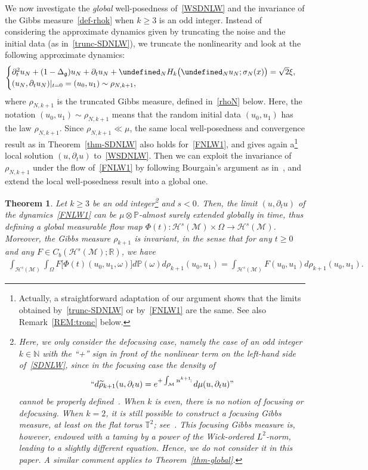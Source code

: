 \documentclass[10pt]{amsart}
\newtheorem{theo}{Theorem}[section]
\theoremstyle{definition}\newtheorem{defi}[theo]{Definition}\newtheorem{rema}[theo]{Remark}\newtheorem{exam}[theo]{Example}\newtheorem{exem}[theo]{Example}\newtheorem{nota}[theo]{Notation}
\newcommand{\R}{\mathbb{R}}
\newcommand{\T}{\mathbb{T}}
\newcommand{\Prob}{\mathbb{P}}
\newcommand{\N}{\mathbb{N}}
\let\P= \undefined
\newcommand{\P}{\mathbf{P}}
\newcommand{\M}{\mathcal{M}}
\renewcommand{\H}{\mathcal{H}}
\newcommand{\g}{\mathfrak{g}}
\newcommand{\Dlg}{\Delta_{\g}}
\newcommand{\s}{\sigma}
\newcommand{\dt}{\partial_t}
\renewcommand{\o}{\omega}
\renewcommand{\O}{\Omega}
\begin{document}
We now investigate the \emph{global} well-posedness of~\eqref{WSDNLW} and the invariance of the Gibbs measure~\eqref{def-rhok} when $k\ge 3$ is an odd integer. Instead of considering the approximate dynamics given by truncating the noise and the initial data (as in~\eqref{trunc-SDNLW}), we truncate the nonlinearity and look at the following approximate dynamics:
\begin{equation}\label{FNLW1}
\begin{cases}
\dt^2 u_N +(1-\Dlg)u_N + \dt u_N + \P_NH_k\big(\P_N u_N;\s_N(x)\big) = \sqrt{2}\xi,\\
(u_N,\dt u_N)|_{t=0}=(u_0,u_1)\sim\rho_{N,k+1},
\end{cases}
\end{equation}
where $\rho_{N,k+1}$ is the truncated Gibbs measure, defined in~\eqref{rhoN} below. Here, the notation $(u_0,u_1)\sim\rho_{N,k+1}$ means that the random initial data $(u_0, u_1)$ has the law $\rho_{N, k+1}$. Since $\rho_{N,k+1}\ll\mu$, the same local well-posedness and convergence result as in Theorem~\ref{thm-SDNLW} also holds for~\eqref{FNLW1}, and gives again a\footnote{Actually, a straightforward adaptation of our argument shows that the limits obtained by~\eqref{trunc-SDNLW} or by~\eqref{FNLW1} are the same. See also Remark~\ref{REM:tronc} below.} local solution $(u,\dt u)$ to~\eqref{WSDNLW}. Then we can exploit the invariance of $\rho_{N,k+1}$ under the flow of~\eqref{FNLW1} by following Bourgain's argument as in~\cite{BO94,BO96,Tz,BT2,BTT2}, and extend the local well-posedness result into a global one.


\begin{theo}\label{thm-invariance}
Let $k \geq 3$ be an odd integer\footnote{Here, we only consider the defocusing case, namely the case of an odd integer $k\in\N$ with the ``+'' sign in front of the nonlinear term on the left-hand side of~\eqref{SDNLW}, since in the focusing case the density of 
\[
``d\widetilde{\rho}_{k+1}(u,\dt u)=e^{+\int_\M\,:\!u^{k+1}\!:\,}d\mu(u,\dt u)\text{''}
\]
cannot be properly defined~\cite{BS, OST}. When $k$ is even, there is no notion of focusing or defocusing. When $k = 2$, it is still possible to construct a focusing Gibbs measure, at least on the flat torus $\T^2$; see~\cite{BO95, OST}. This focusing Gibbs measure is, however, endowed with a taming by a power of the Wick-ordered $L^2$-norm, leading to a slightly different equation. Hence, we do not consider it in this paper. A similar comment applies to Theorem~\ref{thm-global}.} and $s < 0$. Then, the limit $(u,\dt u)$ of the dynamics~\eqref{FNLW1} can be $\mu\otimes\Prob$-almost surely extended globally in time, thus defining a global measurable flow map $\Phi(t) : \H^s(\M)\times \O \to \H^s(\M)$. Moreover, the Gibbs measure $\rho_{k+1}$ is invariant, in the sense that for any $t\ge 0$ and any $F\in C_b(\H^s(\M);\R)$, we have
\begin{align*}
\int_{\H^s(\M)}\int_\O F\big[\Phi(t)(u_0,u_1,\o)\big]d\Prob(\o)d\rho_{k+1}(u_0,u_1) = \int_{\H^s(\M)}F(u_0,u_1)d\rho_{k+1}(u_0,u_1).
\end{align*}
\end{theo}
\end{document}
